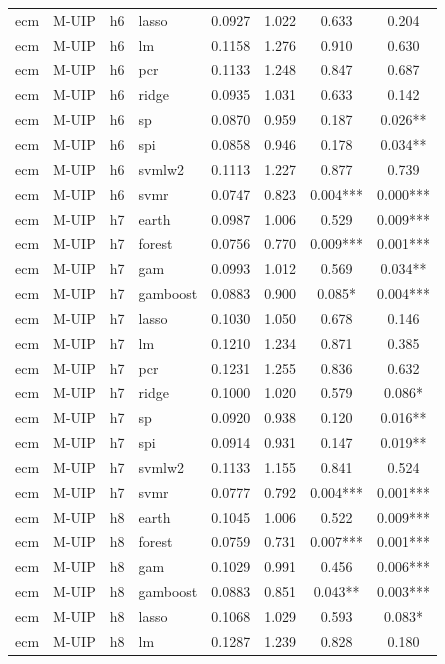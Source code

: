 \begin{ThreePartTable}
\begin{longtable}[t]{llclcccc}
ecm & M-UIP & h6 & lasso & 0.0927 & 1.022 & 0.633 & 0.204\\
ecm & M-UIP & h6 & lm & 0.1158 & 1.276 & 0.910 & 0.630\\
ecm & M-UIP & h6 & pcr & 0.1133 & 1.248 & 0.847 & 0.687\\
ecm & M-UIP & h6 & ridge & 0.0935 & 1.031 & 0.633 & 0.142\\
ecm & M-UIP & h6 & sp & 0.0870 & 0.959 & 0.187 & 0.026**\\
ecm & M-UIP & h6 & spi & 0.0858 & 0.946 & 0.178 & 0.034**\\
ecm & M-UIP & h6 & svmlw2 & 0.1113 & 1.227 & 0.877 & 0.739\\
ecm & M-UIP & h6 & svmr & 0.0747 & 0.823 & 0.004*** & 0.000***\\
\addlinespace
ecm & M-UIP & h7 & earth & 0.0987 & 1.006 & 0.529 & 0.009***\\
ecm & M-UIP & h7 & forest & 0.0756 & 0.770 & 0.009*** & 0.001***\\
ecm & M-UIP & h7 & gam & 0.0993 & 1.012 & 0.569 & 0.034**\\
ecm & M-UIP & h7 & gamboost & 0.0883 & 0.900 & 0.085* & 0.004***\\
ecm & M-UIP & h7 & lasso & 0.1030 & 1.050 & 0.678 & 0.146\\
ecm & M-UIP & h7 & lm & 0.1210 & 1.234 & 0.871 & 0.385\\
ecm & M-UIP & h7 & pcr & 0.1231 & 1.255 & 0.836 & 0.632\\
ecm & M-UIP & h7 & ridge & 0.1000 & 1.020 & 0.579 & 0.086*\\
ecm & M-UIP & h7 & sp & 0.0920 & 0.938 & 0.120 & 0.016**\\
ecm & M-UIP & h7 & spi & 0.0914 & 0.931 & 0.147 & 0.019**\\
ecm & M-UIP & h7 & svmlw2 & 0.1133 & 1.155 & 0.841 & 0.524\\
ecm & M-UIP & h7 & svmr & 0.0777 & 0.792 & 0.004*** & 0.001***\\
\addlinespace
ecm & M-UIP & h8 & earth & 0.1045 & 1.006 & 0.522 & 0.009***\\
ecm & M-UIP & h8 & forest & 0.0759 & 0.731 & 0.007*** & 0.001***\\
ecm & M-UIP & h8 & gam & 0.1029 & 0.991 & 0.456 & 0.006***\\
ecm & M-UIP & h8 & gamboost & 0.0883 & 0.851 & 0.043** & 0.003***\\
ecm & M-UIP & h8 & lasso & 0.1068 & 1.029 & 0.593 & 0.083*\\
ecm & M-UIP & h8 & lm & 0.1287 & 1.239 & 0.828 & 0.180\\

\end{longtable}
\end{ThreePartTable}
